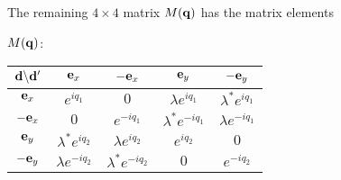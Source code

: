 The remaining  $4\times 4$ matrix $M(\mathbf q)$ has the matrix elements
%
%
%
\begin{center}
$M(\mathbf q)$:
 \begin{tabular}{||c|c c c c||} 
 \hline
 $\mathbf d \backslash  \mathbf d' $&$\mathbf e_{x}$ & $-\mathbf e_{x}$ & $\mathbf e_{y}$  &$-\mathbf e_{y}$ \\ [0.5ex] 
 \hline\hline
$\mathbf e_{x}$  &$e^{iq_{1}}$& $0$& $\lambda e^{i q_{1}}$ & $\lambda^{*}e^{iq_{1}}$ \\ 
\hline
$-\mathbf e_{x}$ &$0$ & $e^{-iq_{1}}$& $\lambda^{*} e^{-i q_{1}}$  & $\lambda e^{-i q_{1}}$ \\
 \hline
 $\mathbf e_{y}$&$\lambda^{*} e^{i q_{2}}$& $\lambda e^{i q_{2}}$ & $e^{iq_{2}}$  & $0$ \\
 \hline
$-\mathbf e_{y}$ &$\lambda e^{-i q_{2}}$  &$\lambda^{*} e^{-i q_{2}}$& $0$ & $e^{-iq_{2}}$ \\[1ex] 
 \hline
\end{tabular}
\end{center}
%

